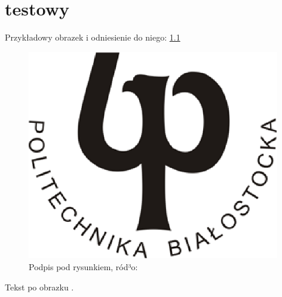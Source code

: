 \chapter{testowy}
Przykładowy obrazek i odniesienie do niego: \ref{rys1_label}

\begin{figure}[htb]
\centering
\includegraphics[width=11cm]{grafika/rys1.eps}
\caption{Podpis pod rysunkiem, ród³o: \cite{inproceedings_1}}
\label{rys1_label}
\end{figure}

Tekst po obrazku \cite{book_1}.
